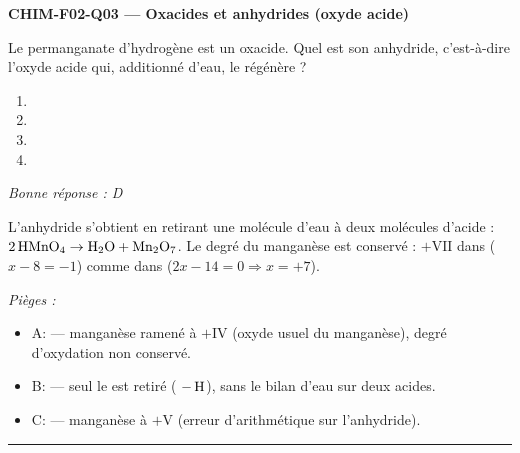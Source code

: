 \documentclass[11pt,a4paper]{article}
\begin{document}
\noindent\textbf{CHIM-F02-Q03 --- Oxacides et anhydrides (oxyde acide)}\par
Le permanganate d'hydrogène  est un oxacide. Quel est son anhydride, c'est-à-dire l'oxyde acide qui, additionné d'eau, le régénère ?
\begin{enumerate}[label=\Alph*)]
\item {}
\item {}
\item {}
\item {}
\end{enumerate}
\textit{Bonne réponse : D}\par
L'anhydride s'obtient en retirant une molécule d'eau à deux molécules d'acide : $2\,\ce{HMnO4} \rightarrow \ce{H2O} + \ce{Mn2O7}$. Le degré du manganèse est conservé : $+\mathrm{VII}$ dans  ($x - 8 = -1$) comme dans  ($2x - 14 = 0 \Rightarrow x = +7$).\par
\textit{Pièges :}
\begin{itemize}
\item A:  --- manganèse ramené à $+\mathrm{IV}$ (oxyde usuel du manganèse), degré d'oxydation non conservé.
\item B:  --- seul le  est retiré ( $-\,\ce{H}$), sans le bilan d'eau sur deux acides.
\item C:  --- manganèse à $+\mathrm{V}$ (erreur d'arithmétique sur l'anhydride).
\end{itemize}
\vspace{8pt}\hrule\vspace{8pt}
\end{document}
